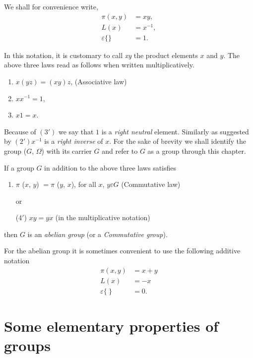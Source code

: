 We shall for convenience write, 
\begin{align*}
  \pi (x, y) & = xy,\\
  L (x) &= x^{-1}, \\
  \varepsilon \{ \} & = 1.
\end{align*} 

In this notation, it is customary to call \textit{xy} the product
elements $x$ and $y$. The above three laws read as follows when
written multiplicatively. 
\begin{enumerate}[(1$'$)]
\item $x (yz) = (xy) z$, \quad (Associative law)
\item $xx^{-1} = 1$,
\item $x1 = x$.
\end{enumerate}

Because of $(3')$ we say that $1$ is a \textit{right neutral }
element. Similarly as suggested by $(2') x^{-1}$ is a \textit{right
  inverse} of $x$. For the sake of brevity we shall identify the group
($G$, $\Omega$) with its carrier $G$ and refer to $G$ as a group
through this chapter. 

If a group $G$ in addition to the above three laws satisfies 
\begin{enumerate}[(4)]
\item $\pi$ ($x$, $y$) $= \pi$ ($y$, $x$), for all $x$, $y \varepsilon
  G$ (Commutative law)  

  or
  
\item[(4$'$)] $xy= yx$ (in the multiplicative notation)
\end{enumerate}  
then $G$ is an \textit{abelian group} (or a \textit{Commutative group}).

For the abelian group it is sometimes convenient to use the following
additive notation 
\begin{align*}
  \pi (x,y) &= x+ y\\
  L (x) & = -x\\
  \varepsilon \{ ~\} & = 0.
\end{align*}

\section{Some elementary properties of groups} %

